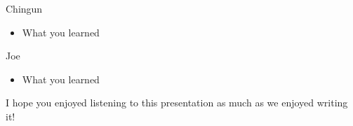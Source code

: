 \documentclass{beamer}
\begin{document}
\begin{frame}{Chingun}
    \begin{itemize}
        \item What you learned
    \end{itemize}
\end{frame}

\begin{frame}{Joe}
    \begin{itemize}
        \item What you learned
    \end{itemize}
\end{frame}

\begin{frame}
  \begin{center}
    \Huge{I hope you enjoyed listening to this presentation as much as we enjoyed writing it!}
  \end{center}
\end{frame}
\end{document}
